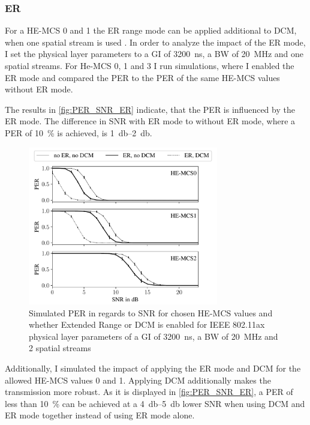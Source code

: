 \subsubsection*{\acf{ER}}
For a HE-MCS \num{0} and \num{1} the \ac{ER} range mode can be applied additional to \ac{DCM}, when one spatial stream is used \cite{noauthor_ieee_2021}.
In order to analyze the impact of the \ac{ER} mode, I set the physical layer parameters to a \ac{GI} of
\SI{3200}{\nano\second}, a \ac{BW} of \SI{20}{\mega\hertz} and one spatial streams.
For He-MCS \num{0}, \num{1} and \num{3} I run simulations, where I enabled the
\ac{ER} mode and compared the \ac{PER} to the \ac{PER} of the same HE-MCS values without \ac{ER} mode.

The results in \autoref{fig:PER_SNR_ER} indicate, that the \ac{PER} is influenced by the \ac{ER} mode.
The difference in \ac{SNR} with \ac{ER} mode to without \ac{ER} mode, where a \ac{PER}
of \SI{10}{\percent} is achieved, is \SIrange{1}{2}{\decibel}.

\begin{figure}%
   \centering
   \includegraphics[width=0.74\textwidth]{figures/ER_PER_to_SNR.pdf}
   \caption{Simulated \ac{PER} in regards to \ac{SNR} for chosen HE-\ac{MCS} values and whether Extended Range or \ac{DCM}
   is enabled for IEEE 802.11ax physical layer parameters of a \ac{GI} of \SI{3200}{\nano\second}, a \ac{BW} of \SI{20}{\mega\hertz} and 2 spatial streams}
   \label{fig:PER_SNR_ER}%
\end{figure}

Additionally, I simulated the impact of applying the \ac{ER} mode and \ac{DCM} for the allowed HE-MCS values \num{0} and \num{1}.
Applying \ac{DCM} additionally makes the transmission more robust.
As it is displayed in \autoref{fig:PER_SNR_ER},
a \ac{PER} of less than \SI{10}{\percent} can be achieved at a \SIrange{4}{5}{\decibel} lower \ac{SNR} when using \ac{DCM} and \ac{ER} mode together instead
of using \ac{ER} mode alone.

